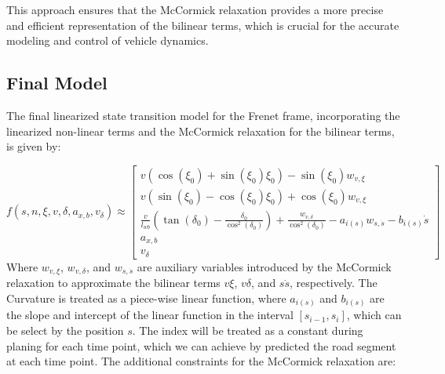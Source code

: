 This approach ensures that the McCormick relaxation provides a more precise and efficient representation of the bilinear terms, which is crucial for
the accurate modeling and control of vehicle dynamics.

\subsection{Final Model} \label{subsec:bicycle_resulting_model}

The final linearized state transition model for the Frenet frame, incorporating the linearized non-linear terms and the McCormick relaxation for the bilinear terms, is given by:

\begin{equation}
	\label{eq:kst_final_dynamics}
	f(s, n, \xi, v, \delta, a_{x,b}, v_\delta )\approx
	\begin{bmatrix}
		v (\cos(\xi_0) + \sin(\xi_0)\xi_0) - \sin(\xi_0) w_{v,\xi}                                                                                                 \\[8pt]
		v (\sin(\xi_0) - \cos(\xi_0)\xi_0) + \cos(\xi_0) w_{v,\xi}                                                                                                 \\[8pt]
		\frac{v}{l_{wb}} (\tan(\delta_0) - \frac{\delta_0}{\cos^2(\delta_0)}) + \frac{w_{v,\delta}}{\cos^2(\delta_0)}  - a_{i(s)} w_{s,\dot{s}} - b_{i(s)} \dot{s} \\[8pt]
		a_{x,b}                                                                                                                                                    \\[8pt]
		v_\delta
	\end{bmatrix}
\end{equation}
Where $w_{v,\xi}$, $w_{v,\delta}$, and $w_{s,\dot{s}}$ are auxiliary variables introduced by the McCormick relaxation to approximate the bilinear
terms $v\xi$, $v\delta$, and $s\dot{s}$, respectively.
The Curvature is treated as a piece-wise linear function, where $a_{i(s)}$ and $b_{i(s)}$ are the slope and intercept of the linear function in the
interval $[s_{i-1}, s_i]$, which can be select by the position $s$.
The index will be treated as a constant during planing for each time point, which we can achieve by predicted the road segment at each time point.
The additional constraints for the McCormick relaxation are:
